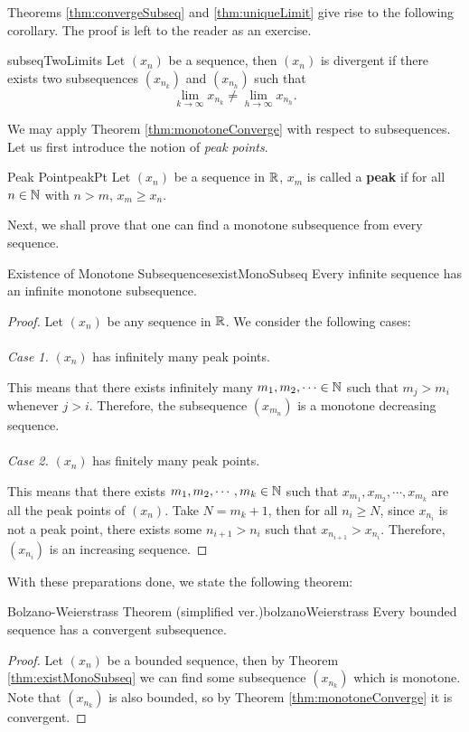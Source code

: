 \documentclass[math]{amznotes}
\theoremstyle{remark}
\begin{document}
Theorems \ref{thm:convergeSubseq} and \ref{thm:uniqueLimit} give rise to the following corollary. The proof is left to the reader as an exercise.
\begin{corbox}{}{subseqTwoLimits}
    Let $(x_n)$ be a sequence, then $(x_n)$ is divergent if there exists two subsequences $(x_{n_k})$ and $(x_{n_h})$ such that 
    \begin{equation*}
        \lim_{k \to \infty}x_{n_k} \neq \lim_{h \to \infty}x_{n_h}.
    \end{equation*}
\end{corbox}
We may apply Theorem \ref{thm:monotoneConverge} with respect to subsequences. Let us first introduce the notion of \textit{peak points}.
\begin{dfnbox}{Peak Point}{peakPt}
    Let $(x_n)$ be a sequence in $\mathbb{R}$, $x_m$ is called a {\color{red} \textbf{peak}} if for all $n \in \mathbb{N}$ with $n > m$, $x_m \geq x_n$.
\end{dfnbox}
Next, we shall prove that one can find a monotone subsequence from every sequence.
\begin{thmbox}{Existence of Monotone Subsequences}{existMonoSubseq}
    Every infinite sequence has an infinite monotone subsequence.
    \tcblower
    \begin{proof}
        Let $(x_n)$ be any sequence in $\mathbb{R}$. We consider the following cases:
        \\\\
        \textit{Case 1.} $(x_n)$ has infinitely many peak points.
        
        This means that there exists infinitely many $m_1, m_2, \cdots \in \mathbb{N}$ such that $m_j > m_i$ whenever $j > i$. Therefore, the subsequence $\left(x_{m_n}\right)$ is a monotone decreasing sequence.
        \\\\
        \textit{Case 2.} $(x_n)$ has finitely many peak points.
        
        This means that there exists $m_1, m_2, \cdots, m_k\in \mathbb{N}$ such that $x_{m_1}, x_{m_2}, \cdots, x_{m_k}$ are all the peak points of $(x_n)$. Take $N = m_k + 1$, then for all $n_{i} \geq N$, since $x_{n_i}$ is not a peak point, there exists some $n_{i + 1} > n_i$ such that $x_{n_{i + 1}} > x_{n_i}$. Therefore, $\left(x_{n_i}\right)$ is an increasing sequence.
    \end{proof}
\end{thmbox}
With these preparations done, we state the following theorem:
\begin{thmbox}{Bolzano-Weierstrass Theorem (simplified ver.)}{bolzanoWeierstrass}
    Every bounded sequence has a convergent subsequence.
    \tcblower
    \begin{proof}
        Let $(x_n)$ be a bounded sequence, then by Theorem \ref{thm:existMonoSubseq} we can find some subsequence $\left(x_{n_k}\right)$ which is monotone. Note that $\left(x_{n_k}\right)$ is also bounded, so by Theorem \ref{thm:monotoneConverge} it is convergent.
    \end{proof}
\end{thmbox}
\end{document}
